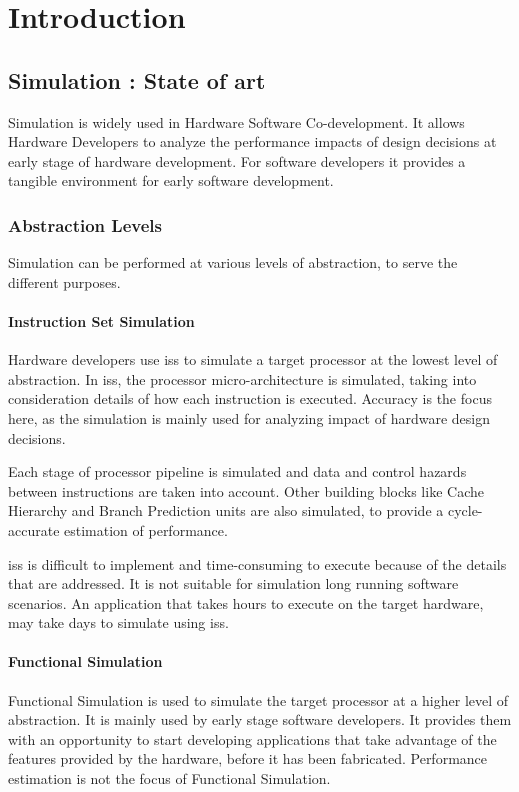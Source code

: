 \chapter{Introduction}\label{chapter:introduction}

\section{Simulation : State of art}

Simulation is widely used in Hardware Software Co-development. It allows Hardware Developers to analyze the performance impacts of design decisions at early stage of hardware development. For software developers it provides a tangible environment for early software development.

\subsection{Abstraction Levels}
Simulation can be performed at various levels of abstraction, to serve the different purposes.

\subsubsection{Instruction Set Simulation}
Hardware developers use \gls{iss} to simulate a target processor at the lowest level of abstraction. In \gls{iss}, the processor micro-architecture is simulated, taking into consideration details of how each instruction is executed. Accuracy is the focus here, as the simulation is mainly used for analyzing impact of hardware design decisions.

Each stage of processor pipeline is simulated and data and control hazards between instructions are taken into account. Other building blocks like Cache Hierarchy and Branch Prediction units are also simulated, to provide a cycle-accurate estimation of performance.

\gls{iss} is difficult to implement and time-consuming to execute because of the details that are addressed. It is not suitable for simulation long running software scenarios. An application that takes hours to execute on the target hardware, may take days to simulate using \gls{iss}.

\subsubsection{Functional Simulation}
Functional Simulation is used to simulate the target processor at a higher level of abstraction. It is mainly used by early stage software developers. It provides them with an opportunity to start developing applications that take advantage of the features provided by the hardware, before it has been fabricated. Performance estimation is not the focus of Functional Simulation.

